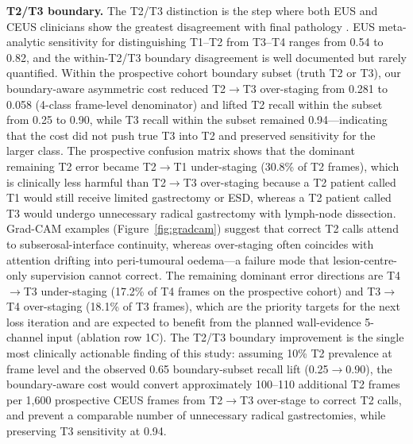\documentclass[11pt,a4paper]{article}
\begin{document}
\textbf{T2/T3 boundary.} The T2/T3 distinction is the step where both EUS and CEUS clinicians show the greatest disagreement with final pathology \cite{mocellin2011eus, kwee2010euse}. EUS meta-analytic sensitivity for distinguishing T1--T2 from T3--T4 ranges from 0.54 to 0.82, and the within-T2/T3 boundary disagreement is well documented but rarely quantified. Within the prospective cohort boundary subset (truth T2 or T3), our boundary-aware asymmetric cost reduced T2$\to$T3 over-staging from 0.281 to 0.058 (4-class frame-level denominator) and lifted T2 recall within the subset from 0.25 to 0.90, while T3 recall within the subset remained 0.94---indicating that the cost did not push true T3 into T2 and preserved sensitivity for the larger class. The prospective confusion matrix shows that the dominant remaining T2 error became T2$\to$T1 under-staging (30.8\% of T2 frames), which is clinically less harmful than T2$\to$T3 over-staging because a T2 patient called T1 would still receive limited gastrectomy or ESD, whereas a T2 patient called T3 would undergo unnecessary radical gastrectomy with lymph-node dissection. Grad-CAM examples (Figure~\ref{fig:gradcam}) suggest that correct T2 calls attend to subserosal-interface continuity, whereas over-staging often coincides with attention drifting into peri-tumoural oedema---a failure mode that lesion-centre-only supervision cannot correct. The remaining dominant error directions are T4$\to$T3 under-staging (17.2\% of T4 frames on the prospective cohort) and T3$\to$T4 over-staging (18.1\% of T3 frames), which are the priority targets for the next loss iteration and are expected to benefit from the planned wall-evidence 5-channel input (ablation row 1C). The T2/T3 boundary improvement is the single most clinically actionable finding of this study: assuming 10\% T2 prevalence at frame level and the observed 0.65 boundary-subset recall lift (0.25$\to$0.90), the boundary-aware cost would convert approximately 100--110 additional T2 frames per 1{,}600 prospective CEUS frames from T2$\to$T3 over-stage to correct T2 calls, and prevent a comparable number of unnecessary radical gastrectomies, while preserving T3 sensitivity at 0.94.
\end{document}
